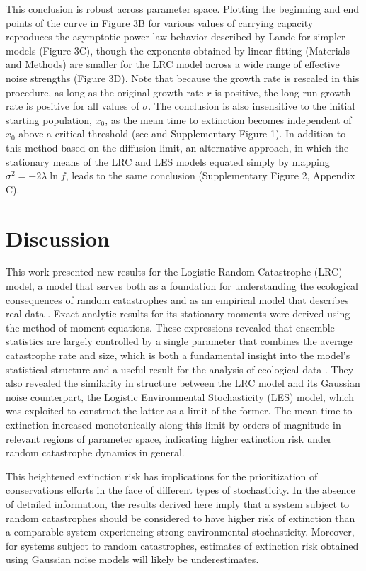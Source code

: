 This conclusion is robust across parameter space.  Plotting the beginning and end points of the curve in Figure 3B for various values of carrying capacity reproduces the asymptotic power law behavior described by Lande for simpler models \cite{lande1993risks} (Figure 3C), though the exponents obtained by linear fitting (Materials and Methods) are smaller for the LRC model across a wide range of effective noise strengths (Figure 3D).  Note that because the growth rate is rescaled in this procedure, as long as the original growth rate $r$ is positive, the long-run growth rate \cite{lande1993risks} is positive for all values of $\sigma$.  The conclusion is also insensitive to the initial starting population, $x_0$, as the mean time to extinction becomes independent of $x_0$ above a critical threshold (see \cite{landeBook,hanson1981} and Supplementary Figure 1).  In addition to this method based on the diffusion limit, an alternative approach, in which the stationary means of the LRC and LES models equated simply by mapping $\sigma^2 = -2\lambda\ln f$, leads to the same conclusion (Supplementary Figure 2, Appendix C).


\section{Discussion}

This work presented new results for the Logistic Random Catastrophe (LRC) model, a model that serves both as a foundation for understanding the ecological consequences of random catastrophes and as an empirical model that describes real data \cite{hanson1981,wilesPLOS2016}.  Exact analytic results for its stationary moments were derived using the method of moment equations.  These expressions revealed that ensemble statistics are largely controlled by a single parameter that combines the average catastrophe rate and size, which is both a fundamental insight into the model's statistical structure and a useful result for the analysis of ecological data \cite{wilesPLOS2016}.  They also revealed the similarity in structure between the LRC model and its Gaussian noise counterpart, the Logistic Environmental Stochasticity (LES) model, which was exploited to construct the latter as a limit of the former.  The mean time to extinction increased monotonically along this limit by orders of magnitude in relevant regions of parameter space, indicating higher extinction risk under random catastrophe dynamics in general.  

This heightened extinction risk has implications for the prioritization of conservations efforts in the face of different types of stochasticity.  In the absence of detailed information, the results derived here imply that a system subject to random catastrophes should be considered to have higher risk of extinction than a comparable system experiencing strong environmental stochasticity.  Moreover, for systems subject to random catastrophes, estimates of extinction risk obtained using Gaussian noise models will likely be underestimates.  

